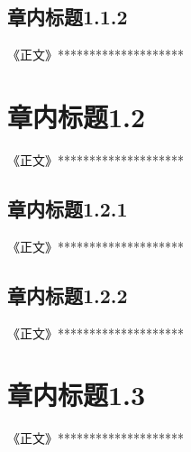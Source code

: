 \subsection{章内标题1.1.2}\label{Sec1.1.2}

《正文》********************











\section{章内标题1.2}\label{Sec1.2}
《正文》********************

\subsection{章内标题1.2.1}\label{Sec1.2.1}
《正文》********************


\subsection{章内标题1.2.2}\label{Sec1.2.2}
《正文》********************







\section{章内标题1.3} \label{Sec1.3}
《正文》********************






























